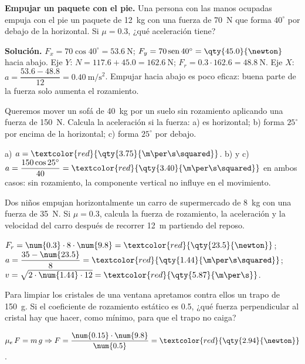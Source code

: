 \begin{example}
    \textbf{Empujar un paquete con el pie.} Una persona con las manos ocupadas empuja con el pie un paquete de \qty{12}{\kg} con una
    fuerza de \qty{70}{\newton} que forma \(40^\circ\) por debajo de la horizontal. Si \(\mu = \num{0.3}\), ¿qué aceleración tiene?

    \textbf{Solución.} \(F_x = 70\cos 40^\circ = \qty{53.6}{\newton}\); \(F_y = 70\sen 40^\circ = \qty{45.0}{\newton}\) hacia abajo.
    Eje \(Y\): \(N = \num{117.6} + \num{45.0} = \qty{162.6}{\newton}\); \(F_r = \num{0.3} \cdot \num{162.6} = \qty{48.8}{\newton}\).
    Eje \(X\): \(a = \dfrac{\num{53.6} - \num{48.8}}{12} = \qty{0.40}{\m\per\s\squared}\). Empujar hacia abajo es poco eficaz: buena
    parte de la fuerza solo aumenta el rozamiento.
\end{example}

\begin{exercise}
    Queremos mover un sofá de \qty{40}{\kg} por un suelo sin rozamiento aplicando una fuerza de \qty{150}{\newton}. Calcula la
    aceleración si la fuerza: a) es horizontal; b) forma \(25^\circ\) por encima de la horizontal; c) forma \(25^\circ\) por debajo.
    \begin{solu}
        a) \(a = \textcolor{red}{\qty{3.75}{\m\per\s\squared}}\). b) y c) \(a = \dfrac{150\cos 25^\circ}{40} = \textcolor{red}{\qty{3.40}{\m\per\s\squared}}\)
        en ambos casos: sin rozamiento, la componente vertical no influye en el movimiento.
    \end{solu}
\end{exercise}

\begin{exercise}
    Dos niños empujan horizontalmente un carro de supermercado de \qty{8}{\kg} con una fuerza de \qty{35}{\newton}. Si \(\mu = \num{0.3}\),
    calcula la fuerza de rozamiento, la aceleración y la velocidad del carro después de recorrer \qty{12}{\m} partiendo del reposo.
    \begin{solu}
        \(F_r = \num{0.3} \cdot 8 \cdot \num{9.8} = \textcolor{red}{\qty{23.5}{\newton}}\); \(a = \dfrac{35 - \num{23.5}}{8} =
        \textcolor{red}{\qty{1.44}{\m\per\s\squared}}\); \(v = \sqrt{2 \cdot \num{1.44} \cdot 12} = \textcolor{red}{\qty{5.87}{\m\per\s}}\).
    \end{solu}
\end{exercise}

\begin{exercise}
    Para limpiar los cristales de una ventana apretamos contra ellos un trapo de \qty{150}{\g}. Si el coeficiente de rozamiento estático
    es \num{0.5}, ¿qué fuerza perpendicular al cristal hay que hacer, como mínimo, para que el trapo no caiga?
    \begin{solu}
        \(\mu_e\,F = m\,g \Rightarrow F = \dfrac{\num{0.15} \cdot \num{9.8}}{\num{0.5}} = \textcolor{red}{\qty{2.94}{\newton}}\).
    \end{solu}
\end{exercise}

